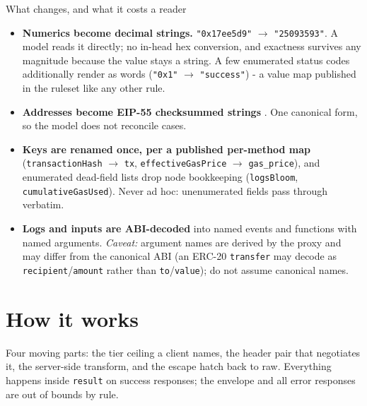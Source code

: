 \documentclass[11pt]{article}
\newcommand{\code}[1]{\texttt{#1}}
\begin{document}
\begin{infobox}{What changes, and what it costs a reader}
\begin{itemize}[leftmargin=1.4em, itemsep=2pt, topsep=2pt]
\item \textbf{Numerics become decimal strings.} \code{"0x17ee5d9"} $\to$ \code{"25093593"}. A model reads it directly; no in-head hex conversion, and exactness survives any magnitude because the value stays a string. A few enumerated status codes additionally render as words (\code{"0x1"} $\to$ \code{"success"}) - a value map published in the ruleset like any other rule.
\item \textbf{Addresses become EIP-55 checksummed strings} \cite{eip55}. One canonical form, so the model does not reconcile cases.
\item \textbf{Keys are renamed once, per a published per-method map} (\code{transactionHash} $\to$ \code{tx}, \code{effectiveGasPrice} $\to$ \code{gas\_price}), and enumerated dead-field lists drop node bookkeeping (\code{logsBloom}, \code{cumulativeGasUsed}). Never ad hoc: unenumerated fields pass through verbatim.
\item \textbf{Logs and inputs are ABI-decoded} into named events and functions with named arguments. \emph{Caveat:} argument names are derived by the proxy and may differ from the canonical ABI (an ERC-20 \code{transfer} may decode as \code{recipient}/\code{amount} rather than \code{to}/\code{value}); do not assume canonical names.
\end{itemize}
\end{infobox}

\section{How it works}

Four moving parts: the tier ceiling a client names, the header pair that negotiates it, the server-side transform, and the escape hatch back to raw. Everything happens inside \code{result} on success responses; the envelope and all error responses are out of bounds by rule.
\end{document}

